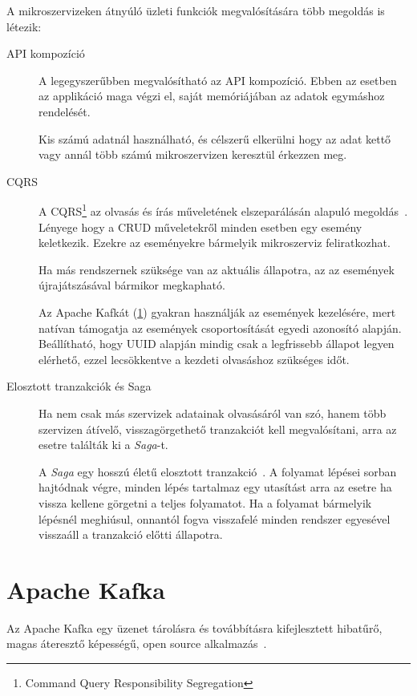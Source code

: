 A mikroszervizeken átnyúló üzleti funkciók megvalósítására több megoldás is létezik:
\begin{description}
	\item[API kompozíció] A legegyszerűbben megvalósítható az API kompozíció. Ebben az esetben az applikáció maga végzi el, saját memóriájában az adatok egymáshoz rendelését. 
	
	Kis számú adatnál használható, és célszerű elkerülni hogy az adat kettő vagy annál több számú mikroszervizen keresztül érkezzen meg.
	
	\item[CQRS] A CQRS\footnote{Command Query Responsibility Segregation} az  olvasás és írás műveletének elszeparálásán alapuló megoldás~\cite{OReally_Microservice_Architecture_CQRS}. Lényege hogy a CRUD műveletekről minden esetben egy esemény keletkezik. Ezekre az eseményekre bármelyik mikroszerviz feliratkozhat.
	
	Ha más rendszernek szüksége van az aktuális állapotra, az az események újrajátszásával bármikor megkapható.	
	 
	Az Apache Kafkát (\ref{sec:apache_kafka}) gyakran használják az események kezelésére, mert natívan támogatja az események csoportosítását egyedi azonosító alapján. Beállítható, hogy UUID alapján mindig csak a legfrissebb állapot legyen elérhető, ezzel lecsökkentve a kezdeti olvasáshoz szükséges időt.
		
	\item[Elosztott tranzakciók és Saga] Ha nem csak más szervizek adatainak olvasásáról van szó, hanem több szervizen átívelő, visszagörgethető tranzakciót kell megvalósítani, arra az esetre találták ki a \textit{Saga}-t.
	
	A \textit{Saga} egy hosszú életű elosztott tranzakció~\cite{OReally_Microservice_Architecture_Saga}. A folyamat lépései sorban hajtódnak végre, minden lépés tartalmaz egy utasítást arra az esetre ha vissza kellene görgetni a teljes folyamatot. Ha a folyamat bármelyik lépésnél meghiúsul, onnantól fogva visszafelé minden rendszer egyesével visszaáll a tranzakció előtti állapotra.
\end{description}


\section{Apache Kafka}\label{sec:apache_kafka}
Az Apache Kafka egy üzenet tárolásra és továbbításra kifejlesztett hibatűrő, magas áteresztő képességű, open source alkalmazás~\cite{OReally_Kafka}.

